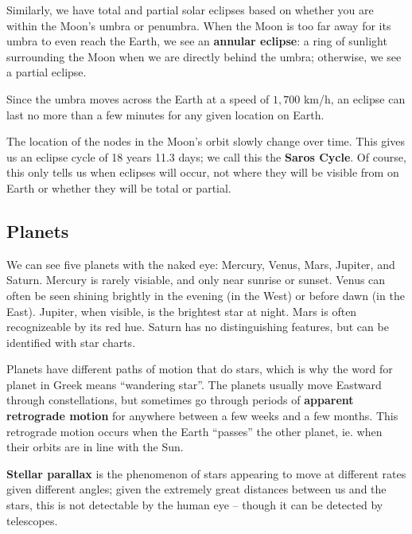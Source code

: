 \documentclass[12pt]{article}
\begin{document}
Similarly, we have total and partial solar eclipses based on whether you are within the Moon's umbra or penumbra. When the Moon is too far away for its umbra to even reach the Earth, we see an {\bf annular eclipse}: a ring of sunlight surrounding the Moon when we are directly behind the umbra; otherwise, we see a partial eclipse.

Since the umbra moves across the Earth at a speed of $1,700$ km/h, an eclipse can last no more than a few minutes for any given location on Earth.

The location of the nodes in the Moon's orbit slowly change over time. This gives us an eclipse cycle of 18 years 11.3 days; we call this the {\bf Saros Cycle}. Of course, this only tells us when eclipses will occur, not where they will be visible from on Earth or whether they will be total or partial.

\subsection{Planets}
We can see five planets with the naked eye: Mercury, Venus, Mars, Jupiter, and Saturn. Mercury is rarely visiable, and only near sunrise or sunset. Venus can often be seen shining brightly in the evening (in the West) or before dawn (in the East). Jupiter, when visible, is the brightest star at night. Mars is often recognizeable by its red hue. Saturn has no distinguishing features, but can be identified with star charts.

Planets have different paths of motion that do stars, which is why the word for planet in Greek means ``wandering star''. The planets usually move Eastward through constellations, but sometimes go through periods of {\bf apparent retrograde motion} for anywhere between a few weeks and a few months. This retrograde motion occurs when the Earth ``passes'' the other planet, ie. when their orbits are in line with the Sun.

{\bf Stellar parallax} is the phenomenon of stars appearing to move at different rates given different angles; given the extremely great distances between us and the stars, this is not detectable by the human eye -- though it can be detected by telescopes.
\end{document}
